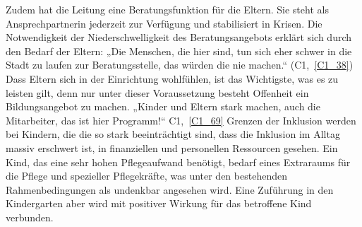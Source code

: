 Zudem hat die Leitung eine Beratungsfunktion für die Eltern. Sie steht als Ansprechpartnerin jederzeit zur Verfügung und stabilisiert in Krisen. Die Notwendigkeit der Niederschwelligkeit des Beratungsangebots erklärt sich durch den Bedarf der Eltern: „Die Menschen, die hier sind, tun sich eher schwer in die Stadt zu laufen zur Beratungsstelle, das würden die nie machen.“ (C1,~\ref{C1_38}) Dass Eltern sich in der Einrichtung wohlfühlen, ist das Wichtigste, was es zu leisten gilt, denn nur unter dieser Voraussetzung besteht Offenheit ein Bildungsangebot zu machen. „Kinder und Eltern stark machen, auch die Mitarbeiter, das ist hier Programm!“ C1,~\ref{C1_69}
Grenzen der Inklusion werden bei Kindern, die die so stark beeinträchtigt sind, dass die Inklusion im Alltag massiv erschwert ist, in finanziellen und personellen Ressourcen gesehen. Ein Kind, das eine sehr hohen Pflegeaufwand benötigt, bedarf eines Extraraums für die Pflege und spezieller Pflegekräfte, was unter den bestehenden Rahmenbedingungen als undenkbar angesehen wird. Eine Zuführung in den Kindergarten aber wird mit positiver Wirkung für das betroffene Kind verbunden.

